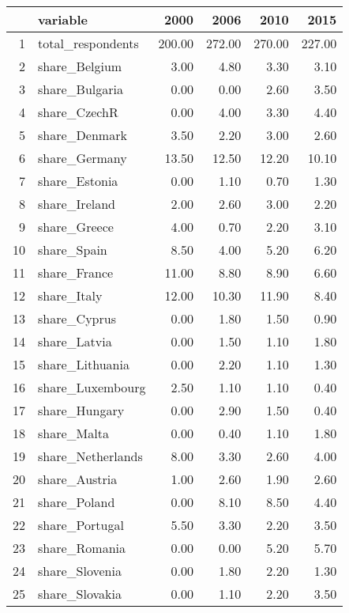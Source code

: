\begin{table}[ht]
\centering
\begin{tabular}{rlrrrr}
  \hline
 & variable & 2000 & 2006 & 2010 & 2015 \\ 
  \hline
1 & total\_respondents & 200.00 & 272.00 & 270.00 & 227.00 \\ 
  2 & share\_Belgium & 3.00 & 4.80 & 3.30 & 3.10 \\ 
  3 & share\_Bulgaria & 0.00 & 0.00 & 2.60 & 3.50 \\ 
  4 & share\_CzechR & 0.00 & 4.00 & 3.30 & 4.40 \\ 
  5 & share\_Denmark & 3.50 & 2.20 & 3.00 & 2.60 \\ 
  6 & share\_Germany & 13.50 & 12.50 & 12.20 & 10.10 \\ 
  7 & share\_Estonia & 0.00 & 1.10 & 0.70 & 1.30 \\ 
  8 & share\_Ireland & 2.00 & 2.60 & 3.00 & 2.20 \\ 
  9 & share\_Greece & 4.00 & 0.70 & 2.20 & 3.10 \\ 
  10 & share\_Spain & 8.50 & 4.00 & 5.20 & 6.20 \\ 
  11 & share\_France & 11.00 & 8.80 & 8.90 & 6.60 \\ 
  12 & share\_Italy & 12.00 & 10.30 & 11.90 & 8.40 \\ 
  13 & share\_Cyprus & 0.00 & 1.80 & 1.50 & 0.90 \\ 
  14 & share\_Latvia & 0.00 & 1.50 & 1.10 & 1.80 \\ 
  15 & share\_Lithuania & 0.00 & 2.20 & 1.10 & 1.30 \\ 
  16 & share\_Luxembourg & 2.50 & 1.10 & 1.10 & 0.40 \\ 
  17 & share\_Hungary & 0.00 & 2.90 & 1.50 & 0.40 \\ 
  18 & share\_Malta & 0.00 & 0.40 & 1.10 & 1.80 \\ 
  19 & share\_Netherlands & 8.00 & 3.30 & 2.60 & 4.00 \\ 
  20 & share\_Austria & 1.00 & 2.60 & 1.90 & 2.60 \\ 
  21 & share\_Poland & 0.00 & 8.10 & 8.50 & 4.40 \\ 
  22 & share\_Portugal & 5.50 & 3.30 & 2.20 & 3.50 \\ 
  23 & share\_Romania & 0.00 & 0.00 & 5.20 & 5.70 \\ 
  24 & share\_Slovenia & 0.00 & 1.80 & 2.20 & 1.30 \\ 
  25 & share\_Slovakia & 0.00 & 1.10 & 2.20 & 3.50 \\ 

\end{tabular}
\end{table}
